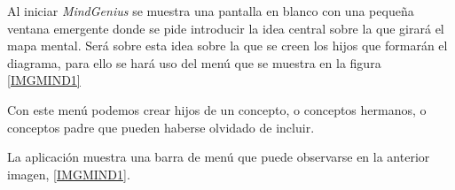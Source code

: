 \documentclass[11pt,a4paper,spanish,twoside]{report}
\begin{document}
        Al iniciar \emph{MindGenius} se muestra una pantalla en blanco con
        una pequeña ventana emergente donde se pide introducir la idea
        central sobre la que girará el mapa mental. Será sobre esta idea
        sobre la que se creen los hijos que formarán el diagrama, para ello
        se hará uso del menú que se muestra en la figura \ref{IMGMIND1}


        Con este menú podemos crear hijos de un concepto, o conceptos
        hermanos, o conceptos padre que pueden haberse olvidado de incluir.

        La aplicación muestra una barra de menú que puede observarse en la
        anterior imagen, \ref{IMGMIND1}. 
        
\end{document}
